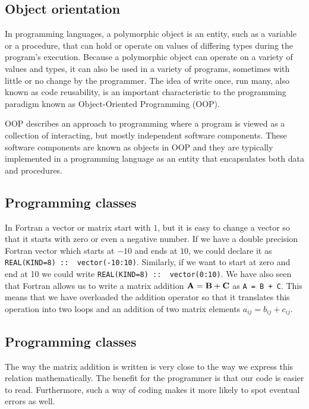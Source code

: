 \documentclass[%
oneside,                 %
final,                   %
10pt]{article}
\begin{document}
{{{{{\noindent
\subsection{Object orientation}

In programming languages, a polymorphic object is an entity, such as a variable or a procedure, that can hold or operate on values of differing types during the program's execution. Because a polymorphic object can operate on a variety of values and types, it can also be used in a variety of programs, sometimes with little or no change by the programmer. The idea of write once, run many, also known as code reusability, is an important characteristic to the programming paradigm known as Object-Oriented Programming (OOP).

OOP describes an approach to programming where a program is viewed as a collection of interacting, but mostly independent software components. These software components are known as objects in OOP and they are typically implemented in a programming language as an entity that encapsulates both data and procedures.

\subsection{Programming classes}

In Fortran a vector or matrix start with $1$, but it is easy
to change a vector so that it starts with zero or even a negative number.
If we have a double precision Fortran vector  which starts at $-10$ and ends at $10$, we could declare it as
\Verb!REAL(KIND=8) ::  vector(-10:10)!. Similarly, if we want to start at zero and end at 10 we could write
\Verb!REAL(KIND=8) ::  vector(0:10)!.
We have also seen that Fortran  allows us to write a matrix addition ${\bf A} = {\bf B}+{\bf C}$ as
\Verb!A = B + C!.  This means that we have overloaded the addition operator so that it translates this operation into
two loops and an addition of two matrix elements $a_{ij} = b_{ij}+c_{ij}$.

\subsection{Programming classes}

The way the matrix addition is written is very close to the way we express this relation mathematically. The benefit for the
programmer is that our code is easier to read. Furthermore, such a way of coding makes it  more likely  to spot eventual
errors as well.

}}}}}
\end{document}
